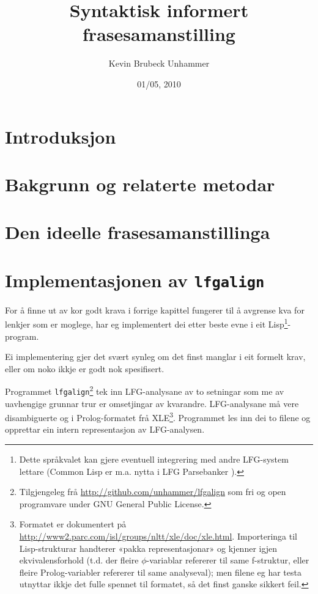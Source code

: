 \documentclass[11pt,a4paper,oneside,draft]{book}
\title{Syntaktisk informert frasesamanstilling }
\author{Kevin Brubeck Unhammer}
\date{01/05, 2010}
\begin{document}
\maketitle

\setcounter{tocdepth}{4}
\tableofcontents
\vspace*{1cm}

\listoffixmes

\chapter{Introduksjon}
\chapter{Bakgrunn og relaterte metodar}
\chapter{Den ideelle frasesamanstillinga}
\chapter{Implementasjonen av \texttt{lfgalign}}
\label{sec-4}

\label{SEC:implementasjon}

For å finne ut av kor godt krava i forrige kapittel fungerer til å
avgrense kva for lenkjer som er moglege, har eg implementert dei etter
beste evne i eit Lisp\footnote{Dette språkvalet kan gjere eventuell integrering med andre
        LFG-system lettare (Common Lisp er m.a. nytta i LFG
        Parsebanker \citep{rosen2009lpt}). }-program.

 Ei implementering gjer det svært synleg om det finst
manglar i eit formelt krav, eller om noko ikkje er godt nok
spesifisert.

Programmet \texttt{lfgalign}\footnote{Tilgjengeleg frå \href{http://github.com/unhammer/lfgalign}{http://github.com/unhammer/lfgalign} som fri og
       open programvare under GNU General Public License. } tek inn LFG-analysane av to
setningar som me av uavhengige grunnar trur er omsetjingar av
kvarandre. LFG-analysane må vere disambiguerte og i Prolog-formatet
frå XLE\footnote{Formatet er dokumentert på
       \href{http://www2.parc.com/isl/groups/nltt/xle/doc/xle.html}{http://www2.parc.com/isl/groups/nltt/xle/doc/xle.html}. Importeringa
       til Lisp-strukturar handterer «pakka representasjonar» og
       kjenner igjen ekvivalensforhold (t.d. der fleire
       $\phi$-variablar refererer til same f-struktur, eller fleire
       Prolog-variabler refererer til same analyseval); men filene eg
       har testa utnyttar ikkje det fulle spennet til formatet, så det
       finst ganske sikkert feil. }. Programmet les inn dei to filene og opprettar ein
intern representasjon av LFG-analysen.  
\end{document}
